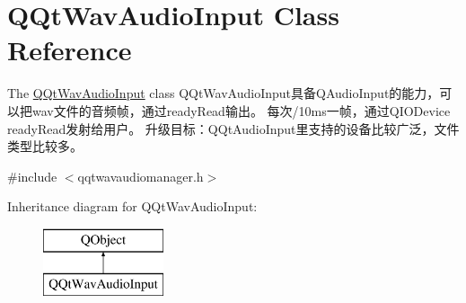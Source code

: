 \hypertarget{class_q_qt_wav_audio_input}{}\section{Q\+Qt\+Wav\+Audio\+Input Class Reference}
\label{class_q_qt_wav_audio_input}


The \mbox{\hyperlink{class_q_qt_wav_audio_input}{Q\+Qt\+Wav\+Audio\+Input}} class Q\+Qt\+Wav\+Audio\+Input具备\+Q\+Audio\+Input的能力，可以把wav文件的音频帧，通过ready\+Read输出。 每次/10ms一帧，通过\+Q\+I\+O\+Device ready\+Read发射给用户。 升级目标：\+Q\+Qt\+Audio\+Input里支持的设备比较广泛，文件类型比较多。  




{\ttfamily \#include $<$qqtwavaudiomanager.\+h$>$}

Inheritance diagram for Q\+Qt\+Wav\+Audio\+Input\+:\begin{figure}[H]
\begin{center}
\leavevmode
\includegraphics[height=2.000000cm]{class_q_qt_wav_audio_input}
\end{center}
\end{figure}
